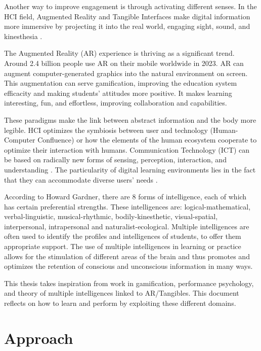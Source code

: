 Another way to improve engagement is through activating different senses. In the HCI field, Augmented Reality and Tangible Interfaces make digital information more immersive by projecting it into the real world, engaging sight, sound, and kinesthesia \cite{seichter2007augmented}.

The Augmented Reality (AR) experience is thriving as a significant trend. Around 2.4 billion people use AR on their mobile worldwide in 2023. AR can augment computer-generated graphics into the natural environment on screen. This augmentation can serve gamification, improving the education system efficacity and making students' attitudes more positive. It makes learning interesting, fun, and effortless, improving collaboration and capabilities.

These paradigms make the link between abstract information and the body more legible.
HCI optimizes the symbiosis between user and technology (Human-Computer Confluence) or how the elements of the human ecosystem cooperate to optimize their interaction with humans. Communication Technology (ICT) can be based on radically new forms of sensing, perception, interaction, and understanding \cite{ferscha2007human}. The particularity of digital learning environments lies in the fact that they can accommodate diverse users' needs \cite{stephanidis2019seven}.

According to Howard Gardner, there are 8 forms of intelligence, each of which has certain preferential strengths. These intelligences are: logical-mathematical, verbal-linguistic, musical-rhythmic, bodily-kinesthetic, visual-spatial, interpersonal, intrapersonal and naturalist-ecological. Multiple intelligences are often used to identify the profiles and intelligences of students, to offer them appropriate support. The use of multiple intelligences in learning or practice allows for the stimulation of different areas of the brain and thus promotes and optimizes the retention of conscious and unconscious information in many ways.

This thesis takes inspiration from work in gamification, performance psychology, and theory of multiple intelligences linked to AR/Tangibles. This document reflects on how to learn and perform by exploiting these different domains.

\section{Approach}

